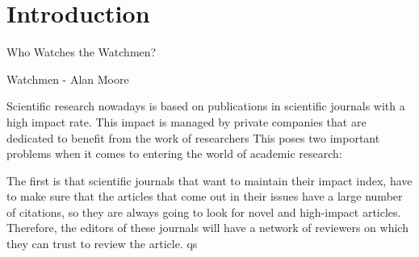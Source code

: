 \chapter{Introduction}

\begin{FraseCelebre}
  \begin{Frase}
    Who Watches the Watchmen?
  \end{Frase}
  \begin{Fuente}
    Watchmen - Alan Moore
  \end{Fuente}
\end{FraseCelebre}

Scientific research nowadays is based on publications in scientific journals
with a high impact rate. This impact is managed by private companies that are
dedicated to benefit from the work of researchers This poses two important
problems when it comes to entering the world of academic research:

The first is that scientific journals that want to maintain their impact index,
have to make sure that the articles that come out in their issues have a large
number of citations, so they are always going to look for novel and high-impact
articles. Therefore, the editors of these journals will have a network of reviewers
on which they can trust to review the article. qs


